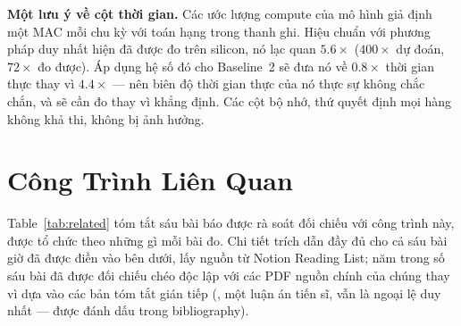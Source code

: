 \documentclass[11pt]{article}
\begin{document}
\textbf{Một lưu ý về cột thời gian.} Các ước lượng compute của mô hình giả
định một MAC mỗi chu kỳ với toán hạng trong thanh ghi. Hiệu chuẩn với
phương pháp duy nhất hiện đã được đo trên silicon, nó lạc quan
$5.6\times$ ($400\times$ dự đoán, $72\times$ đo được). Áp dụng hệ số đó
cho Baseline~2 sẽ đưa nó về $0.8\times$ thời gian thực thay vì
$4.4\times$ --- nên biên độ thời gian thực của nó thực sự không chắc chắn,
và sẽ cần đo thay vì khẳng định. Các cột bộ nhớ, thứ quyết định mọi hàng
không khả thi, không bị ảnh hưởng.

\section{Công Trình Liên Quan}
\label{sec:related}

Table~\ref{tab:related} tóm tắt sáu bài báo được rà soát đối chiếu với
công trình này, được tổ chức theo những gì mỗi bài đo. Chi tiết trích
dẫn đầy đủ cho cả sáu bài giờ đã được điền vào bên dưới, lấy nguồn từ
Notion Reading List; năm trong số sáu bài đã được đối chiếu chéo độc lập
với các PDF nguồn chính của chúng thay vì dựa vào các bản tóm tắt gián
tiếp (\cite{aidriven}, một luận án tiến sĩ, vẫn là ngoại lệ duy nhất ---
được đánh dấu trong bibliography).
\end{document}
